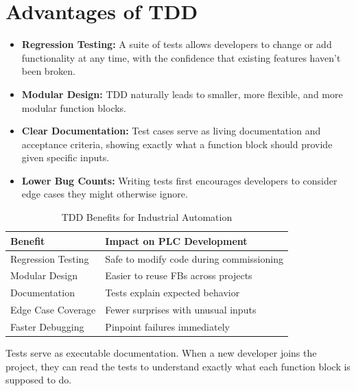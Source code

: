 \documentclass[11pt,a4paper]{article}
\begin{document}
\section{Advantages of TDD}

\begin{itemize}[leftmargin=*]
    \item \textbf{Regression Testing:} A suite of tests allows developers to change or add functionality at any time, with the confidence that existing features haven't been broken.
    \item \textbf{Modular Design:} TDD naturally leads to smaller, more flexible, and more modular function blocks.
    \item \textbf{Clear Documentation:} Test cases serve as living documentation and acceptance criteria, showing exactly what a function block should provide given specific inputs.
    \item \textbf{Lower Bug Counts:} Writing tests first encourages developers to consider edge cases they might otherwise ignore.
\end{itemize}

\begin{table}[h]
\centering
\begin{tabular}{@{}ll@{}}
\toprule
\textbf{Benefit} & \textbf{Impact on PLC Development} \\
\midrule
Regression Testing & Safe to modify code during commissioning \\
Modular Design & Easier to reuse FBs across projects \\
Documentation & Tests explain expected behavior \\
Edge Case Coverage & Fewer surprises with unusual inputs \\
Faster Debugging & Pinpoint failures immediately \\
\bottomrule
\end{tabular}
\caption{TDD Benefits for Industrial Automation}
\end{table}

\begin{tipbox}
Tests serve as executable documentation. When a new developer joins the project, they can read the tests to understand exactly what each function block is supposed to do.
\end{tipbox}

\end{document}
